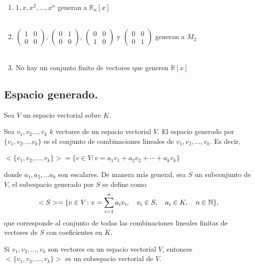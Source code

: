 \begin{ejem}
\begin{enumerate}
\item
$1,x,x^2, \dots, x^n$ generan a $\mathbb{R}_n[x]$
\\\

\item
$\begin{pmatrix} 1 & 0 \\ 0 & 0 \end{pmatrix}$, $\begin{pmatrix} 0 & 1 \\ 0 & 0 \end{pmatrix}$, $\begin{pmatrix} 0 & 0 \\ 1 & 0 \end{pmatrix}$ y $\begin{pmatrix} 0 & 0 \\ 0 & 1 \end{pmatrix}$ generan a $M_{2}$
\\\

\item
No hay un conjunto finito de vectores que generen $\mathbb{R}[x]$
\end{enumerate}
\end{ejem}


\subsection{Espacio generado.}

Sea $V$ un espacio vectorial sobre $K$.
\begin{defin}
Sea $v_1, v_2 \dots , v_k$ $k$ vectores de un espacio vectorial $V$. El espacio generado por $\{ v_1,v_2, \dots v_k \}$ es el conjunto de combinaciones lineales de $v_1,v_2, \dots ,v_k$. Es decir, 
\begin{center}
   $<\{v_1, v_2, \dots , v_k \}> = \{ v\in V\colon v =  a_1 v_1 + a_2 v_2 + \cdots + a_k v_k \}$  
\end{center}
donde $a_1, a_2, \dots a_k$ son escalares. De manera m\'as general, sea $S$ un subconjunto de $V$, el subespacio generado por $S$ se define como
\[<S>=\{v\in V\colon v=\sum_{i=1}^n a_i v_i,\quad v_i\in S, \quad a_i \in K, \quad n\in \mathbb{N}\},\]
que corresponde al conjunto de todas las
combinaciones lineales finitas de vectores de $S$ con coeficientes en $K$,
\end{defin}

\begin{thm}
Si $v_1, v_2, \dots, v_k$ son vectores en un espacio vectorial $V$, entonces $<\{v_1, v_2, \dots , v_k \}>$ es un subespacio vectorial de $V$.
\end{thm}

